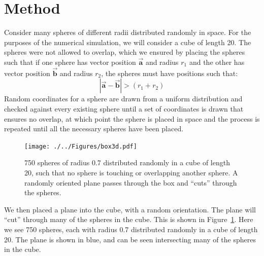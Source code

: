 \documentclass[journal]{IEEEtran}
\begin{document}
\section{Method}
Consider many spheres of different radii distributed randomly in space. For the
purposes of the numerical simulation, we will consider a cube of length 20. The
spheres were not allowed to overlap, which we ensured by placing the spheres such
that if one sphere has vector position $\overrightarrow{\textbf{a}}$ and radius
$r_{1}$ and the other has vector position $\overrightarrow{\textbf{b}}$ and
radius $r_{2}$, the spheres must have positions such that:
\begin{equation*}
|\overrightarrow{\textbf{a}} - \overrightarrow{\textbf{b}}| > (r_{1} + r_{2})
\end{equation*}
Random coordinates for a sphere are drawn from a uniform distribution and
checked against every existing sphere until a set of coordinates is drawn that
ensures no overlap, at which point the sphere is placed in space and the process
is repeated until all the necessary spheres have been placed.

\begin{figure}[H]%
\begin{center}
\texttt{[image: ./../Figures/box3d.pdf]}
\caption{750 spheres of radius 0.7 distributed randomly in a cube of length 20,
  such that no sphere is touching or overlapping another sphere. A randomly
  oriented plane passes through the box and ``cuts'' through the
  spheres.}\label{fig:3dplot_plane}
\end{center}
\end{figure}

We then placed a plane into the cube, with a random orientation. The plane will
``cut'' through many of the spheres in the cube. This is shown in
Figure~\ref{fig:3dplot_plane}. Here we see 750 spheres, each with radius 0.7
distributed randomly in a cube of length 20. The plane is shown in blue, and can
be seen intersecting many of the spheres in the cube.
\end{document}
